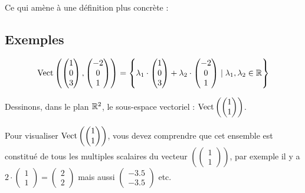 Ce qui amène à une définition \og plus concrète \fg :



\subsection{Exemples}


\example
	\[ 
		\textup{Vect}\left(  \begin{pmatrix} 1 \\0 \\ 3 \end{pmatrix}, \begin{pmatrix} -2 \\ 0 \\1 \end{pmatrix} \right) = \left\{ \lambda_1 \cdot  \begin{pmatrix} 1 \\0 \\ 3 \end{pmatrix} + 	\lambda_2 \cdot \begin{pmatrix} -2 \\ 0 \\1 \end{pmatrix}  \mid \lambda_1, \lambda_2 \in \mathbb{R} \right\}
	\]	

\example


Dessinons, dans le plan $\mathbb{R}^2$, le sous-espace vectoriel : 	$\textup{Vect}\left(  \begin{pmatrix} 1 \\ 1 \end{pmatrix}\right)$.


\begin{center}
	
\end{center}

Pour visualiser $\textup{Vect}\left(  \begin{pmatrix} 1 \\ 1 \end{pmatrix}\right)$, vous devez comprendre que cet ensemble est constitué de tous les multiples scalaires du vecteur $\left(  \begin{pmatrix} 1 \\ 1 \end{pmatrix}\right)$, par exemple il y a $2\cdot \begin{pmatrix} 1 \\ 1 \end{pmatrix}= \begin{pmatrix} 2 \\ 2 \end{pmatrix}$ mais aussi $ \begin{pmatrix} -3.5 \\ -3.5 \end{pmatrix}$ etc.

